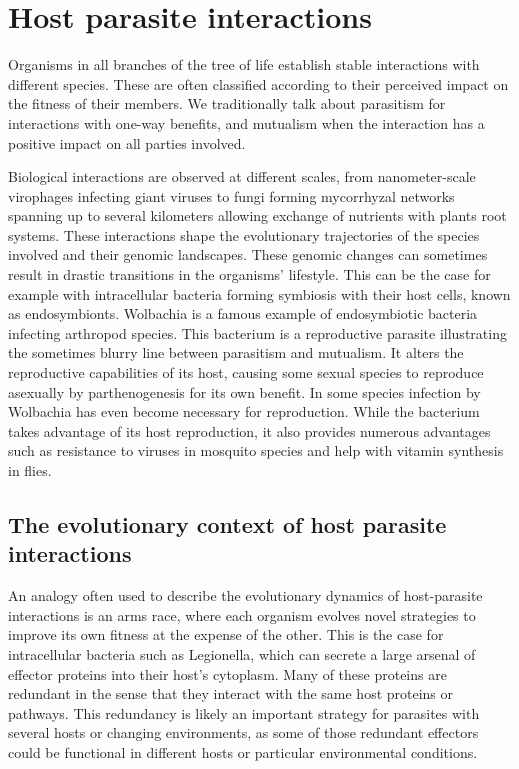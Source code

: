 
\chapter{Host parasite interactions} %

\label{ch:01-01} %


Organisms in all branches of the tree of life establish stable interactions with different species. These are often classified according to their perceived impact on the fitness of their members. We traditionally talk about parasitism for interactions with one-way benefits, and mutualism when the interaction has a positive impact on all parties involved.

Biological interactions are observed at different scales, from nanometer-scale virophages infecting giant viruses to fungi forming mycorrhyzal networks spanning up to several kilometers allowing exchange of nutrients with plants root systems. These interactions shape the evolutionary trajectories of the species involved and their genomic landscapes. These genomic changes can sometimes result in drastic transitions in the organisms' lifestyle. This can be the case for example with intracellular bacteria forming symbiosis with their host cells, known as endosymbionts. Wolbachia is a famous example of endosymbiotic bacteria infecting arthropod species. This bacterium is a reproductive parasite illustrating the sometimes blurry line between parasitism and mutualism. It alters the reproductive capabilities of its host, causing some sexual species to reproduce asexually by parthenogenesis for its own benefit. In some species infection by Wolbachia has even become necessary for reproduction. While the bacterium takes advantage of its host reproduction, it also provides numerous advantages such as resistance to viruses in mosquito species and help with vitamin synthesis in flies.


\section{The evolutionary context of host parasite interactions}

An analogy often used to describe the evolutionary dynamics of host-parasite interactions is an arms race, where each organism evolves novel strategies to improve its own fitness at the expense of the other. This is the case for intracellular bacteria such as Legionella, which can secrete a large arsenal of effector proteins into their host's cytoplasm. Many of these proteins are redundant in the sense that they interact with the same host proteins or pathways. This redundancy is likely an important strategy for parasites with several hosts or changing environments, as some of those redundant effectors could be functional in different hosts or particular environmental conditions.

